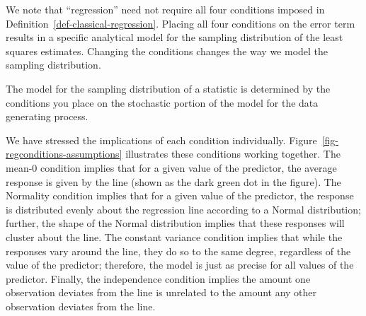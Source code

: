 \documentclass[
  letterpaper,
  DIV=11,
  numbers=noendperiod]{scrreprt}
\theoremstyle{plain}
\theoremstyle{definition}
\theoremstyle{definition}
\theoremstyle{remark}
\begin{document}
We note that ``regression'' need not require all four conditions imposed
in Definition~\ref{def-classical-regression}. Placing all four
conditions on the error term results in a specific analytical model for
the sampling distribution of the least squares estimates. Changing the
conditions changes the way we model the sampling distribution.

\begin{tcolorbox}[enhanced jigsaw, breakable, titlerule=0mm, colframe=quarto-callout-tip-color-frame, bottomtitle=1mm, opacityback=0, rightrule=.15mm, toptitle=1mm, arc=.35mm, bottomrule=.15mm, left=2mm, title=\textcolor{quarto-callout-tip-color}{\faLightbulb}\hspace{0.5em}{Big Idea}, leftrule=.75mm, coltitle=black, toprule=.15mm, colbacktitle=quarto-callout-tip-color!10!white, colback=white, opacitybacktitle=0.6]

The model for the sampling distribution of a statistic is determined by
the conditions you place on the stochastic portion of the model for the
data generating process.

\end{tcolorbox}

We have stressed the implications of each condition individually.
Figure~\ref{fig-regconditions-assumptions} illustrates these conditions
working together. The mean-0 condition implies that for a given value of
the predictor, the average response is given by the line (shown as the
dark green dot in the figure). The Normality condition implies that for
a given value of the predictor, the response is distributed evenly about
the regression line according to a Normal distribution; further, the
shape of the Normal distribution implies that these responses will
cluster about the line. The constant variance condition implies that
while the responses vary around the line, they do so to the same degree,
regardless of the value of the predictor; therefore, the model is just
as precise for all values of the predictor. Finally, the independence
condition implies the amount one observation deviates from the line is
unrelated to the amount any other observation deviates from the line.
\end{document}
